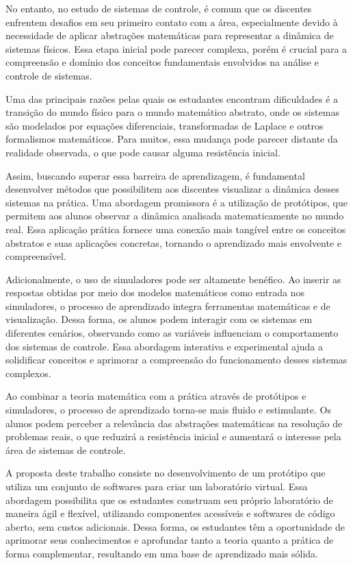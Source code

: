 No entanto, no estudo de sistemas de controle, é comum que os discentes enfrentem desafios em seu primeiro contato com a área, especialmente devido à necessidade de aplicar abstrações matemáticas para representar a dinâmica de sistemas físicos. Essa etapa inicial pode parecer complexa, porém é crucial para a compreensão e domínio dos conceitos fundamentais envolvidos na análise e controle de sistemas.

Uma das principais razões pelas quais os estudantes encontram dificuldades é a transição do mundo físico para o mundo matemático abstrato, onde os sistemas são modelados por equações diferenciais, transformadas de Laplace e outros formalismos matemáticos. Para muitos, essa mudança pode parecer distante da realidade observada, o que pode causar alguma resistência inicial.

Assim, buscando superar essa barreira de aprendizagem, é fundamental desenvolver métodos que possibilitem aos discentes visualizar a dinâmica desses sistemas na prática. Uma abordagem promissora é a utilização de protótipos, que permitem aos alunos observar a dinâmica analisada matematicamente no mundo real. Essa aplicação prática fornece uma conexão mais tangível entre os conceitos abstratos e suas aplicações concretas, tornando o aprendizado mais envolvente e compreensível.

Adicionalmente, o uso de simuladores pode ser altamente benéfico. Ao inserir as respostas obtidas por meio dos modelos matemáticos como entrada nos simuladores, o processo de aprendizado integra ferramentas matemáticas e de visualização. Dessa forma, os alunos podem interagir com os sistemas em diferentes cenários, observando como as variáveis influenciam o comportamento dos sistemas de controle. Essa abordagem interativa e experimental ajuda a solidificar conceitos e aprimorar a compreensão do funcionamento desses sistemas complexos.

Ao combinar a teoria matemática com a prática através de protótipos e simuladores, o processo de aprendizado torna-se mais fluido e estimulante. Os alunos podem perceber a relevância das abstrações matemáticas na resolução de problemas reais, o que reduzirá a resistência inicial e aumentará o interesse pela área de sistemas de controle.

A proposta deste trabalho consiste no desenvolvimento de um protótipo que utiliza um conjunto de softwares para criar um laboratório virtual. Essa abordagem possibilita que os estudantes construam seu próprio laboratório de maneira ágil e flexível, utilizando componentes acessíveis e softwares de código aberto, sem custos adicionais. Dessa forma, os estudantes têm a oportunidade de aprimorar seus conhecimentos e aprofundar tanto a teoria quanto a prática de forma complementar, resultando em uma base de aprendizado mais sólida.

